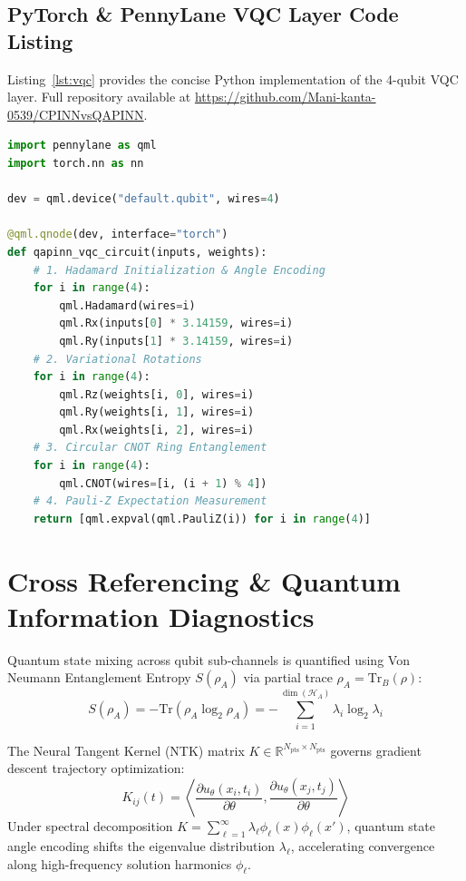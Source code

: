 \documentclass[pdflatex,sn-jnl]{sn-jnl}%
\begin{document}
\subsection{PyTorch \& PennyLane VQC Layer Code Listing}\label{sec7.1}
Listing~\ref{lst:vqc} provides the concise Python implementation of the 4-qubit VQC layer. Full repository available at \url{https://github.com/Mani-kanta-0539/CPINNvsQAPINN}.

\begin{lstlisting}[language=Python, caption={PyTorch/PennyLane 4-Qubit VQC Layer Definition.}, label={lst:vqc}]
import pennylane as qml
import torch.nn as nn

dev = qml.device("default.qubit", wires=4)

@qml.qnode(dev, interface="torch")
def qapinn_vqc_circuit(inputs, weights):
    # 1. Hadamard Initialization & Angle Encoding
    for i in range(4):
        qml.Hadamard(wires=i)
        qml.Rx(inputs[0] * 3.14159, wires=i)
        qml.Ry(inputs[1] * 3.14159, wires=i)
    # 2. Variational Rotations
    for i in range(4):
        qml.Rz(weights[i, 0], wires=i)
        qml.Ry(weights[i, 1], wires=i)
        qml.Rx(weights[i, 2], wires=i)
    # 3. Circular CNOT Ring Entanglement
    for i in range(4):
        qml.CNOT(wires=[i, (i + 1) % 4])
    # 4. Pauli-Z Expectation Measurement
    return [qml.expval(qml.PauliZ(i)) for i in range(4)]
\end{lstlisting}

\section{Cross Referencing \& Quantum Information Diagnostics}\label{sec8}
Quantum state mixing across qubit sub-channels is quantified using Von Neumann Entanglement Entropy $S(\rho_A)$ via partial trace $\rho_A = \text{Tr}_B(\rho)$:
\begin{equation}\label{eq:entropy}
S(\rho_A) = -\text{Tr}(\rho_A \log_2 \rho_A) = -\sum_{i=1}^{\dim(\mathcal{H}_A)} \lambda_i \log_2 \lambda_i
\end{equation}

The Neural Tangent Kernel (NTK) matrix $K \in \mathbb{R}^{N_{\text{pts}} \times N_{\text{pts}}}$ governs gradient descent trajectory optimization:
\begin{equation}\label{eq:ntk}
K_{ij}(t) = \left\langle \frac{\partial u_\theta(x_i,t_i)}{\partial \theta}, \frac{\partial u_\theta(x_j,t_j)}{\partial \theta} \right\rangle
\end{equation}
Under spectral decomposition $K = \sum_{\ell=1}^{\infty} \lambda_\ell \phi_\ell(x) \phi_\ell(x')$, quantum state angle encoding shifts the eigenvalue distribution $\lambda_\ell$, accelerating convergence along high-frequency solution harmonics $\phi_\ell$.
\end{document}
